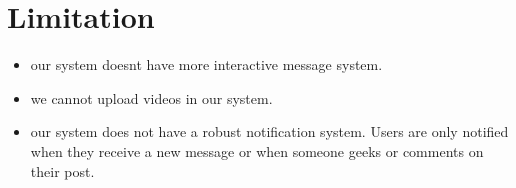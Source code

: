 \documentclass{article}
\begin{document}
\section{Limitation}
\begin{itemize}
    \item our system doesnt have more interactive message system.
    \item we cannot upload videos in our system.
    \item our system does not have a robust notification system. Users are only notified when they receive a new message or when someone geeks or comments on their post.
\end{itemize}
\end{document}
